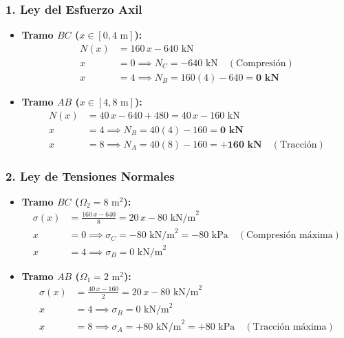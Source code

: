 \subsubsection{1. Ley del Esfuerzo Axil}
\begin{itemize}
    \item \textbf{Tramo $BC$ ($x \in [0, 4\text{ m}]$):}
    \begin{align}
        N(x) &= 160\,x - 640\text{ kN} \\
        x &= 0 \implies N_C = -640\text{ kN} \quad (\text{Compresión}) \\
        x &= 4 \implies N_B = 160(4) - 640 = \mathbf{0\text{ kN}}
    \end{align}
    \item \textbf{Tramo $AB$ ($x \in [4, 8\text{ m}]$):}
    \begin{align}
        N(x) &= 40\,x - 640 + 480 = 40\,x - 160\text{ kN} \\
        x &= 4 \implies N_B = 40(4) - 160 = \mathbf{0\text{ kN}} \\
        x &= 8 \implies N_A = 40(8) - 160 = \mathbf{+160\text{ kN}} \quad (\text{Tracción})
    \end{align}
\end{itemize}

\subsubsection{2. Ley de Tensiones Normales}
\begin{itemize}
    \item \textbf{Tramo $BC$ ($\Omega_2 = 8\text{ m}^2$):}
    \begin{align}
        \sigma(x) &= \frac{160\,x - 640}{8} = 20\,x - 80\text{ kN/m}^2 \\
        x &= 0 \implies \sigma_C = -80\text{ kN/m}^2 = -80\text{ kPa} \quad (\text{Compresión máxima}) \\
        x &= 4 \implies \sigma_B = 0\text{ kN/m}^2
    \end{align}
    \item \textbf{Tramo $AB$ ($\Omega_1 = 2\text{ m}^2$):}
    \begin{align}
        \sigma(x) &= \frac{40\,x - 160}{2} = 20\,x - 80\text{ kN/m}^2 \\
        x &= 4 \implies \sigma_B = 0\text{ kN/m}^2 \\
        x &= 8 \implies \sigma_A = +80\text{ kN/m}^2 = +80\text{ kPa} \quad (\text{Tracción máxima})
    \end{align}
\end{itemize}

